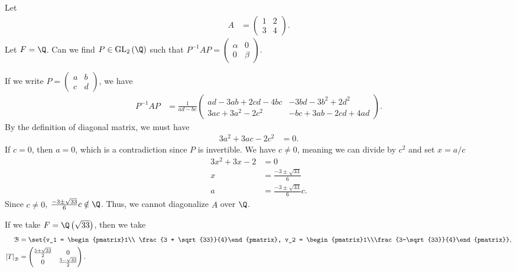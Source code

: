 \documentclass[10pt]{mypackage}
\begin{document}
\begin{example}
  Let
  \begin{align*}
    A &= \begin{pmatrix}1& 2\\ 3&4\end{pmatrix}.
  \end{align*}
  Let $F = \Q$. Can we find $P \in \text{GL}_2\left(\Q\right)$ such that $P^{-1}AP = \begin{pmatrix}\alpha & 0\\ 0 & \beta\end{pmatrix}$.\newline

  If we write $P = \begin{pmatrix}a & b \\c & d\end{pmatrix}$, we have
  \begin{align*}
    P^{-1}AP &= \frac{1}{ad-bc} \begin{pmatrix}ad - 3ab + 2cd - 4bc & -3bd - 3b^2 + 2d^2\\ 3ac + 3a^2 - 2c^2 & -bc + 3ab - 2cd + 4ad\end{pmatrix}.
  \end{align*}
  By the definition of diagonal matrix, we must have
  \begin{align*}
    3a^2 + 3ac - 2c^2 &= 0.
  \end{align*}
  If $c = 0$, then $a = 0$, which is a contradiction since $P$ is invertible. We have $c\neq 0$, meaning we can divide by $c^2$ and set $x = a/c$
  \begin{align*}
    3x^2 + 3x - 2 &= 0\\
    x &= \frac{-3 \pm \sqrt{33}}{6}\\
    a &= \frac{-3 \pm \sqrt{33}}{6}c.
  \end{align*}
  Since $c\neq 0$, $\frac{-3 \pm \sqrt{33}}{6}c \notin \Q$. Thus, we cannot diagonalize $A$ over $\Q$.\newline

  If we take $F = \Q\left(\sqrt{33}\right)$, then we take
  \begin{align*}
    \mathcal{B} &= \set{v_1 = \begin{pmatrix}1\\ \frac{3 + \sqrt{33}}{4}\end{pmatrix}, v_2 = \begin{pmatrix}1\\\frac{3-\sqrt{33}}{4}\end{pmatrix}},\\
    \left[T\right]_{\mathcal{B}} &= \begin{pmatrix}\frac{5 + \sqrt{33}}{2} & 0 \\ 0 & \frac{5-\sqrt{33}}{2}\end{pmatrix}.
  \end{align*}
\end{example}
\end{document}
